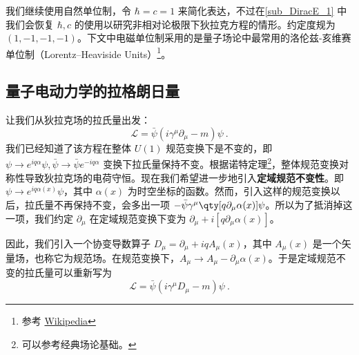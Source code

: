 

我们继续使用自然单位制，令 $\hbar=c=1$ 来简化表达，不过在\autoref{sub_DiracE_1} 中我们会恢复 $\hbar,c$ 的使用以研究非相对论极限下狄拉克方程的情形。约定度规为 $(1,-1,-1,-1)$。下文中电磁单位制采用的是量子场论中最常用的洛伦兹-亥维赛单位制（Lorentz–Heaviside Units）\footnote{参考 \href{https://en.wikipedia.org/wiki/Heaviside\%E2\%80\%93Lorentz_units}{Wikipedia}}。

\subsection{量子电动力学的拉格朗日量}
让我们从狄拉克场的拉氏量出发：
\begin{equation}
\mathcal{L}=\bar\psi (i\gamma^\mu \partial_\mu - m)\psi ~.
\end{equation}
我们已经知道了该方程在整体 $U(1)$ 规范变换下是不变的，即 $\psi\rightarrow e^{iq\alpha}\psi,\bar\psi \rightarrow \bar\psi e^{-iq\alpha}$ 变换下拉氏量保持不变。根据诺特定理\footnote{可以参考经典场论基础。}，整体规范变换对称性导致狄拉克场的电荷守恒。现在我们希望进一步地引入\textbf{定域规范不变性}。即 $\psi\rightarrow e^{iq\alpha(x)}\psi $，其中 $\alpha(x)$ 为时空坐标的函数。然而，引入这样的规范变换以后，拉氏量不再保持不变，会多出一项 $-\bar\psi \gamma^\mu \qty[q\partial_\mu \alpha(x)]\psi$。所以为了抵消掉这一项，我们约定 $\partial_\mu$ 在定域规范变换下变为 $\partial_\mu+i[q\partial_\mu \alpha(x)]$。

因此，我们引入一个协变导数算子 $D_\mu = \partial_\mu +iqA_\mu(x)$，其中 $A_\mu(x)$ 是一个矢量场，也称它为规范场。在规范变换下，$A_\mu\rightarrow A_\mu - \partial_\mu \alpha(x)$。于是定域规范不变的拉氏量可以重新写为
\begin{equation}
\mathcal{L}=\bar\psi(i\gamma^\mu D_\mu-m)\psi ~.
\end{equation}

